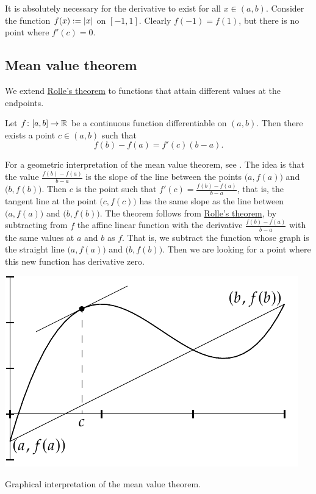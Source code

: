 It is absolutely necessary for the derivative to exist for all $x
\in (a,b)$.  Consider the function $f(x) := \left\lvert {x} \right\rvert$ on $[-1,1]$.
Clearly $f(-1) = f(1)$, but there is no point where $f'(c) = 0$.

\subsection{Mean value theorem}

We extend \hyperref[thm:rolle]{Rolle's theorem}
to functions that attain different
values at the endpoints.

\begin{thm} \label{thm:mvt}
Let $f \colon [a,b] \to {\mathbb{R}}$ be a continuous function
differentiable on $(a,b)$.  Then there exists a point $c \in (a,b)$
such that
\begin{equation*}
f(b)-f(a) = f'(c)(b-a) .
\end{equation*}
\end{thm}

For a geometric interpretation of the mean value theorem, see
.  The idea is that the value $\frac{f(b)-f(a)}{b-a}$
is the slope of the line between the points $\bigl(a,f(a)\bigr)$
and $\bigl(b,f(b)\bigr)$.
Then $c$ is the point such that $f'(c) = \frac{f(b)-f(a)}{b-a}$, that 
is, the tangent line at the point $\bigl(c,f(c)\bigr)$ has the same slope as the
line between $\bigl(a,f(a)\bigr)$ and $\bigl(b,f(b)\bigr)$.
The theorem follows from \hyperref[thm:rolle]{Rolle's theorem},
by subtracting from $f$ the affine linear function with the derivative
$\frac{f(b)-f(a)}{b-a}$ with the same values at $a$ and $b$ as $f$.
That is, we subtract the function whose graph is the straight line
$\bigl(a,f(a)\bigr)$ and $\bigl(b,f(b)\bigr)$.
Then we are looking for a point where this new
function has derivative zero.

\begin{myfigureht}
\includegraphics{figures/mvtfig}
\caption{Graphical interpretation of the mean value theorem.\label{mvtfig}}
\end{myfigureht}


